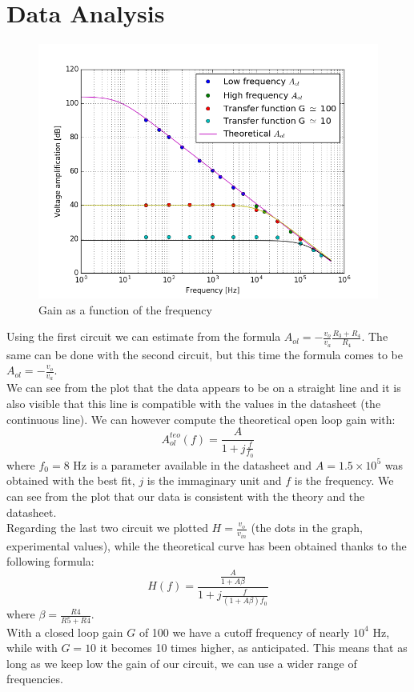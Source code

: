 \section{Data Analysis}
\begin{figure}[H]
\centering
\includegraphics[width=.7\textwidth]{4/decibel.png}
\caption{Gain as a function of the frequency}
\end{figure}
Using the first circuit we can estimate from the formula $A_{ol} = - \frac{v_{o}}{v_a} \frac{R_3 + R_4}{R_4}$.
The same can be done with the second circuit, but this time the formula comes to be $A_{ol} = - \frac{v_{o}}{v_a}$. \\
We can see from the plot that the data appears to be on a straight line and it is also visible that this line is compatible with the values in the datasheet (the continuous line).
We can  however compute the theoretical open loop gain with: $$A_{ol}^{teo}(f) = \frac{A}{1 + j\frac{f}{f_0}}$$ where $f_0 = 8$ Hz is a parameter available in the datasheet and  $A = 1.5 \times 10^5$ was obtained with the best fit, $j$ is the immaginary unit and $f$ is the frequency. We can see from the plot that our data is consistent with the theory and the datasheet.\\
Regarding the last two circuit we plotted $H = \frac{v_{o}}{v_{in}}$ (the dots in the graph, experimental values), while the theoretical curve has been obtained thanks to the following formula:
\[H(f) = \frac{\frac{A}{1 + A \beta}}{1 + j \frac{f}{(1 + A \beta)f_0}}\]
where $\beta = \frac{R4}{R5+R4}$.\\
With a closed loop gain $G$ of 100 we have a cutoff frequency of nearly $10^4$ Hz, while with $G = 10$ it becomes 10 times higher, as anticipated. This means that as long as we keep low the gain of our circuit, we can use a wider range of frequencies. 
